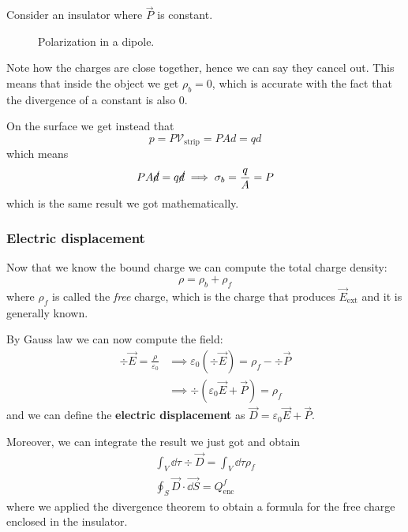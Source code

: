 \documentclass[12pt]{extarticle}
\begin{document}
Consider an insulator where $\vec P$ is constant.
\begin{figure}[H]
    \centering
    
    \caption{Polarization in a dipole.}
\end{figure}

Note how the charges are close together, hence we can say they cancel out.
This means that inside the object we get $\rho_b = 0$, which is accurate with the fact that the divergence of a constant is also $0$.

On the surface we get instead that
\begin{equation}
    p = P \mathcal V_\text{strip} = P A d = qd
\end{equation}
which means
\begin{equation}
    P A \cancel d = q \cancel d \implies \sigma_b = \frac{q}{A} = P
\end{equation}
which is the same result we got mathematically.

\subsubsection{Electric displacement}

Now that we know the bound charge we can compute the total charge density:
\begin{equation}
    \rho = \rho_b + \rho_f
\end{equation}
where $\rho_f$ is called the \emph{free} charge,
which is the charge that produces $\vec E_\text{ext}$
and it is generally known.

By Gauss law we can now compute the field:
\begin{align}
    \div \vec E = \frac{\rho}{\varepsilon_0} & \implies \varepsilon_0 (\div \vec E) = \rho_f - \div \vec P \\
                                             & \implies \div (\varepsilon_0 \vec E + \vec P) = \rho_f
\end{align}
and we can define the \textbf{electric displacement} as $\vec D = \varepsilon_0 \vec E + \vec P$.

Moreover, we can integrate the result we just got and obtain
\begin{gather}
    \int_V \dd \tau \div \vec D = \int_V \dd \tau \rho_f \\
    \oint_S \vec D \cdot \vec{\dd S} = Q_\text{enc}^f
\end{gather}
where we applied the divergence theorem to obtain a formula for the free charge enclosed in the insulator.
\end{document}
